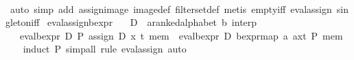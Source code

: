 \begin{isabellebody}
%
\isadelimproof
\ \ %
\endisadelimproof
%
\isatagproof
{}\isamarkupfalse%
\ {}auto\ simp\ add{}\ assign{}image\ image{}def\ filter{}set{}def{}\ {}metis\ empty{}iff\ eval{}assign{}\ singleton{}iff{}{}%
\endisatagproof
{\isafoldproof}%
%
\isadelimproof
\isanewline
%
\endisadelimproof
\isanewline
{}\isamarkupfalse%
\ eval{}assign{}{}bexpr{}\isanewline
\ \ \ D\ {}{}\ {}{}{}a{}{}ranked{}alphabet{}\ {}b{}\ interp{}\isanewline
\ \ \ {}eval{}bexpr\ D\ P\ {}assign\ D\ x\ t\ mem{}\ {}\ eval{}bexpr\ D\ {}bexpr{}map\ {}{}a{}\ a{}x{}t{}{}\ P{}\ mem{}\isanewline
%
\isadelimproof
\ \ %
\endisadelimproof
%
\isatagproof
{}\isamarkupfalse%
\ {}induct\ P{}\ simp{}all{}\ rule\ eval{}assign{}{}\ auto{}%
\endisatagproof
{\isafoldproof}%

\end{isabellebody}
